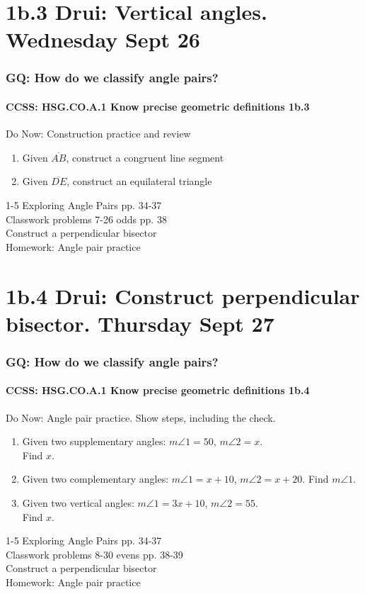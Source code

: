 \documentclass{beamer}
\begin{document}
\section{1b.3 Drui: Vertical angles. Wednesday Sept 26}
  \frame
  {
    \frametitle{GQ: How do we classify angle pairs?}
    \framesubtitle{CCSS: HSG.CO.A.1 Know precise geometric definitions  \alert{1b.3}}

    \begin{block}{Do Now: Construction practice and review}
    \begin{enumerate}
        \item Given $\overline{AB}$, construct a congruent line segment
        \item Given $\overline{DE}$, construct an equilateral triangle
    \end{enumerate}
    \end{block}
    1-5 Exploring Angle Pairs pp. 34-37\\
    Classwork problems 7-26 odds pp. 38\\
    Construct a perpendicular bisector \\
    \vspace{0.5cm}
    Homework: Angle pair practice
  }

\section{1b.4 Drui: Construct perpendicular bisector. Thursday Sept 27}
  \frame
  {
    \frametitle{GQ: How do we classify angle pairs?}
    \framesubtitle{CCSS: HSG.CO.A.1 Know precise geometric definitions  \alert{1b.4}}

    \begin{block}{Do Now: Angle pair practice. Show steps, including the check.}
    \begin{enumerate}
        \item Given two supplementary angles: $m \angle 1 = 50$, $m \angle 2 = x$.\\ Find $x$.
        \item Given two complementary angles: $m \angle 1 = x+10$, $m \angle 2 = x+20$. Find $m \angle 1$.
        \item Given two vertical angles: $m \angle 1 = 3x+10$, $m \angle 2 = 55$.\\ Find $x$.
    \end{enumerate}
    \end{block}
    1-5 Exploring Angle Pairs pp. 34-37\\
    Classwork problems 8-30 evens pp. 38-39\\
    Construct a perpendicular bisector \\
    \vspace{0.2cm}
    Homework: Angle pair practice
  }
\end{document}
